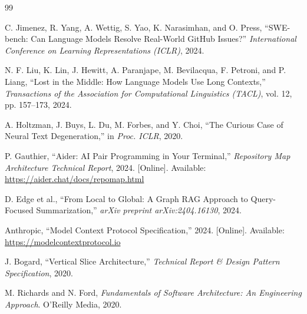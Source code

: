 \documentclass[conference]{IEEEtran}
\begin{document}
\begin{thebibliography}{99}

C. Jimenez, R. Yang, A. Wettig, S. Yao, K. Narasimhan, and O. Press, ``SWE-bench: Can Language Models Resolve Real-World GitHub Issues?'' \textit{International Conference on Learning Representations (ICLR)}, 2024.

N. F. Liu, K. Lin, J. Hewitt, A. Paranjape, M. Bevilacqua, F. Petroni, and P. Liang, ``Lost in the Middle: How Language Models Use Long Contexts,'' \textit{Transactions of the Association for Computational Linguistics (TACL)}, vol. 12, pp. 157--173, 2024.

A. Holtzman, J. Buys, L. Du, M. Forbes, and Y. Choi, ``The Curious Case of Neural Text Degeneration,'' in \textit{Proc. ICLR}, 2020.

P. Gauthier, ``Aider: AI Pair Programming in Your Terminal,'' \textit{Repository Map Architecture Technical Report}, 2024. [Online]. Available: \url{https://aider.chat/docs/repomap.html}

D. Edge et al., ``From Local to Global: A Graph RAG Approach to Query-Focused Summarization,'' \textit{arXiv preprint arXiv:2404.16130}, 2024.

Anthropic, ``Model Context Protocol Specification,'' 2024. [Online]. Available: \url{https://modelcontextprotocol.io}

J. Bogard, ``Vertical Slice Architecture,'' \textit{Technical Report \& Design Pattern Specification}, 2020.

M. Richards and N. Ford, \textit{Fundamentals of Software Architecture: An Engineering Approach}. O'Reilly Media, 2020.

\end{thebibliography}
\end{document}
